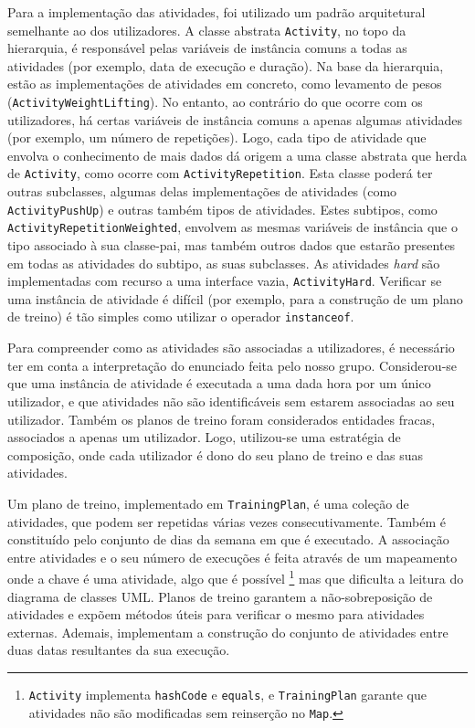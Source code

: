 \documentclass[12pt, a4paper]{article}
\begin{document}
Para a implementação das atividades, foi utilizado um padrão arquitetural semelhante ao dos
utilizadores. A classe abstrata \texttt{Activity}, no topo da hierarquia, é responsável pelas
variáveis de instância comuns a todas as atividades (por exemplo, data de execução e duração). Na
base da hierarquia, estão as implementações de atividades em concreto, como levamento de pesos
(\texttt{ActivityWeightLifting}). No entanto, ao contrário do que ocorre com os utilizadores, há
certas variáveis de instância comuns a apenas algumas atividades (por exemplo, um número de
repetições). Logo, cada tipo de atividade que envolva o conhecimento de mais dados dá origem a uma
classe abstrata que herda de \texttt{Activity}, como ocorre com \texttt{ActivityRepetition}. Esta
classe poderá ter outras subclasses, algumas delas implementações de atividades (como
\texttt{ActivityPushUp}) e outras também tipos de atividades. Estes subtipos, como
\texttt{ActivityRepetitionWeighted}, envolvem as mesmas variáveis de instância que o tipo associado
à sua classe-pai, mas também outros dados que estarão presentes em todas as atividades do subtipo,
as suas subclasses. As atividades \emph{hard} são implementadas com recurso a uma interface vazia,
\texttt{ActivityHard}. Verificar se uma instância de atividade é difícil (por exemplo, para a
construção de um plano de treino) é tão simples como utilizar o operador \texttt{instanceof}.

Para compreender como as atividades são associadas a utilizadores, é necessário ter em conta a
interpretação do enunciado feita pelo nosso grupo. Considerou-se que uma instância de atividade é
executada a uma dada hora por um único utilizador, e que atividades não são identificáveis sem
estarem associadas ao seu utilizador. Também os planos de treino foram considerados entidades
fracas, associados a apenas um utilizador. Logo, utilizou-se uma estratégia de composição, onde
cada utilizador é dono do seu plano de treino e das suas atividades.

Um plano de treino, implementado em \texttt{TrainingPlan}, é uma coleção de atividades, que podem
ser repetidas várias vezes consecutivamente. Também é constituído pelo conjunto de dias da semana
em que é executado. A associação entre atividades e o seu número de execuções é feita através de um
mapeamento onde a chave é uma atividade, algo que é possível \footnote{\texttt{Activity} implementa
\texttt{hashCode} e \texttt{equals}, e \texttt{TrainingPlan} garante que atividades não são
modificadas sem reinserção no \texttt{Map}.} mas que dificulta a leitura do diagrama de classes UML.
Planos de treino garantem a não-sobreposição de atividades e expõem métodos úteis para verificar o
mesmo para atividades externas. Ademais, implementam a construção do conjunto de atividades entre
duas datas resultantes da sua execução.
\end{document}
